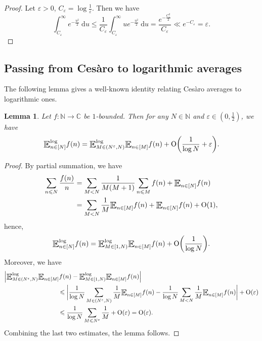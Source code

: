 \documentclass[letter,11pt]{article}
\theoremstyle{plain} %
\newtheorem{lemma}[theorem]{Lemma}
\theoremstyle{definition} %
\theoremstyle{plain}
\theoremstyle{plain}
\theoremstyle{plain}
\numberwithin{equation}{section}
\newcommand{\Cesaro}{Ces\`{a}ro}
\newcommand{\Oh}{{\mathrm O}}
\newcommand{\N}{\mathbb{N}}
\newcommand{\C}{\mathbb{C}}
\renewcommand{\epsilon}{\varepsilon}
\renewcommand{\leq}{\leqslant}
\renewcommand{\d}{~\mathrm{d}}
\newcommand{\E}{\raisebox{-0.4ex}{\scalebox{1.4}[1.3]{$\mathbb{E}$}}}
\newcommand{\Esub}[1]{\raisebox{-0.4ex}{\scalebox{1.4}[1.3]{$\mathbb{E}$}}\raisebox{-0.35ex}{\ensuremath{_{\scriptstyle #1}}}}
\newcommand{\logE}{{\E}^{\log}}
\newcommand{\1}{\mathbbm{1}}
\begin{document}
\begin{proof}
    Let $\epsilon>0$, $C_\epsilon = \log\frac{1}{\epsilon}$. Then we have
    $$\int_{C_\epsilon}^\infty e^{-\frac{u^2}{2}} \d u
    \leq \frac{1}{C_\epsilon}\int_{C_\epsilon}^\infty u e^{-\frac{u^2}{2}} \d u
    = \frac{e^{-\frac{C_\epsilon^2}{2}}}{C_\epsilon}
    \ll e^{-C_\epsilon}
    = \epsilon.$$
\end{proof}

\subsection{Passing from \Cesaro{} to logarithmic averages}

The following lemma gives a well-known identity relating \Cesaro{} averages to logarithmic ones.

\begin{lemma}\label{Cesaro_to_log}
Let $f\colon\N\to\C$ be $1$-bounded. Then for any $N\in\N$ and $\epsilon\in\left(0,\frac{1}{2}\right)$, we have
$$\logE_{n\in[N]} f(n) = \logE_{M\in(N^\epsilon,N)}\Esub{n\in[M]} f(n) + \Oh\bigg(\frac{1}{\log{N}} + \epsilon\bigg).$$
\end{lemma}

\begin{proof}
By partial summation, we have 
\begin{align*}
    \sum_{n\leq N} \frac{f(n)}{n} 
    & = \sum_{M<N}\frac{1}{M(M+1)}\sum_{n\leq M} f(n) + \Esub{n\in[N]} f(n) \\
    & = \sum_{M<N}\frac{1}{M}\Esub{n\in[M]} f(n) + \Esub{n\in[N]} f(n) + \Oh(1),
\end{align*}
hence,
$$\logE_{n\in[N]} f(n) = \logE_{M\in[1,N)}\Esub{n\in[M]} f(n) + \Oh\bigg(\frac{1}{\log{N}}\bigg).$$
Moreover, we have
\begin{align*}
    & \Big|\logE_{M\in(N^\epsilon,N)}\Esub{n\in[M]} f(n) - \logE_{M\in[1,N)}\Esub{n\in[M]} f(n)\Big| \\
    & \hspace*{3cm} \leq \bigg|\frac{1}{\log{N}}\sum_{M\in(N^\epsilon,N)}\frac{1}{M}\Esub{n\in[M]} f(n) - \frac{1}{\log{N}}\sum_{M<N}\frac{1}{M}\Esub{n\in[M]} f(n)\bigg| + \Oh(\epsilon) \\
    & \hspace*{3cm} \leq \frac{1}{\log{N}}\sum_{M\leq N^\epsilon}\frac{1}{M} + \Oh(\epsilon) 
    = \Oh(\epsilon).
\end{align*}
Combining the last two estimates, the lemma follows.
\end{proof}
\end{document}
